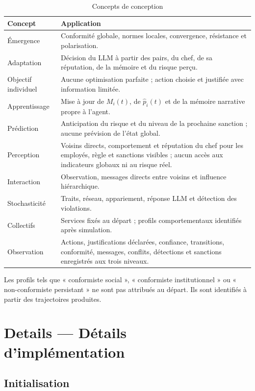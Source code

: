 \documentclass[10pt,a4paper]{article}
\begin{document}
\begin{table}[H]
\centering
\caption{Concepts de conception}
\begin{tabularx}{\textwidth}{@{}L{30mm}Y@{}}
\toprule
{}
\color{white}\textbf{Concept} &
\color{white}\textbf{Application}\\
\midrule
Émergence &
Conformité globale, normes locales, convergence, résistance et polarisation.\\
Adaptation &
Décision du LLM à partir des pairs, du chef, de sa réputation, de la mémoire et
du risque perçu.\\
Objectif individuel &
Aucune optimisation parfaite ; action choisie et justifiée avec information
limitée.\\
Apprentissage &
Mise à jour de $M_i(t)$, de $\widehat p_i(t)$ et de la mémoire narrative
propre à l’agent.\\
Prédiction &
Anticipation du risque et du niveau de la prochaine sanction ; aucune
prévision de l’état global.\\
Perception &
Voisins directs, comportement et réputation du chef pour les employés, règle
et sanctions visibles ; aucun accès aux indicateurs globaux ni au risque réel.\\
Interaction &
Observation, messages directs entre voisins et influence hiérarchique.\\
Stochasticité &
Traits, réseau, appariement, réponse LLM et détection des violations.\\
Collectifs &
Services fixés au départ ; profils comportementaux identifiés après simulation.\\
Observation &
Actions, justifications déclarées, confiance, transitions, conformité,
messages, conflits, détections et sanctions enregistrés aux trois niveaux.\\
\bottomrule
\end{tabularx}
\end{table}

Les profils tels que « conformiste social », « conformiste institutionnel » ou
« non-conformiste persistant » ne sont pas attribués au départ. Ils sont
identifiés à partir des trajectoires produites.

\section{Details — Détails d’implémentation}

\subsection{Initialisation}
\end{document}
